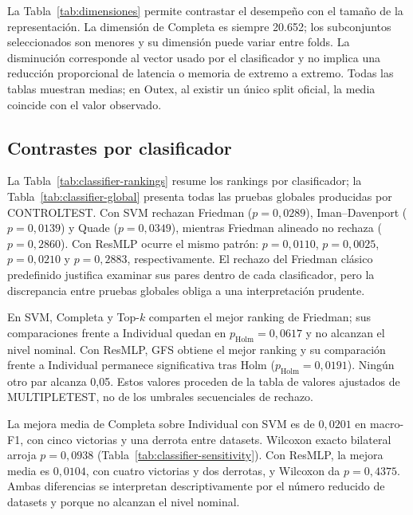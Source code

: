 \documentclass[a4paper,fleqn]{cas-sc}
\begin{document}
La Tabla~\ref{tab:dimensiones} permite contrastar el desempeño con el tamaño de la representación. La dimensión de Completa es siempre 20.652; los subconjuntos seleccionados son menores y su dimensión puede variar entre folds. La disminución corresponde al vector usado por el clasificador y no implica una reducción proporcional de latencia o memoria de extremo a extremo. Todas las tablas muestran medias; en Outex, al existir un único split oficial, la media coincide con el valor observado.

\subsection{Contrastes por clasificador}\label{sec:replica-paiva}

La Tabla~\ref{tab:classifier-rankings} resume los rankings por clasificador; la Tabla~\ref{tab:classifier-global} presenta todas las pruebas globales producidas por CONTROLTEST. Con SVM rechazan Friedman ($p=0{,}0289$), Iman--Davenport ($p=0{,}0139$) y Quade ($p=0{,}0349$), mientras Friedman alineado no rechaza ($p=0{,}2860$). Con ResMLP ocurre el mismo patrón: $p=0{,}0110$, $p=0{,}0025$, $p=0{,}0210$ y $p=0{,}2883$, respectivamente. El rechazo del Friedman clásico predefinido justifica examinar sus pares dentro de cada clasificador, pero la discrepancia entre pruebas globales obliga a una interpretación prudente.




En SVM, Completa y Top-$k$ comparten el mejor ranking de Friedman; sus comparaciones frente a Individual quedan en $p_{\mathrm{Holm}}=0{,}0617$ y no alcanzan el nivel nominal. Con ResMLP, GFS obtiene el mejor ranking y su comparación frente a Individual permanece significativa tras Holm ($p_{\mathrm{Holm}}=0{,}0191$). Ningún otro par alcanza 0,05. Estos valores proceden de la tabla de valores ajustados de MULTIPLETEST, no de los umbrales secuenciales de rechazo.



La mejora media de Completa sobre Individual con SVM es de $0{,}0201$ en macro-F1, con cinco victorias y una derrota entre datasets. Wilcoxon exacto bilateral arroja $p=0{,}0938$ (Tabla~\ref{tab:classifier-sensitivity}). Con ResMLP, la mejora media es $0{,}0104$, con cuatro victorias y dos derrotas, y Wilcoxon da $p=0{,}4375$. Ambas diferencias se interpretan descriptivamente por el número reducido de datasets y porque no alcanzan el nivel nominal.
\end{document}
